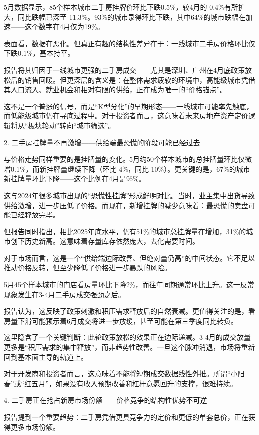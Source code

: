 \documentclass[11pt]{ctexart}
\begin{document}
5月数据显示，85个样本城市二手房挂牌价环比下跌0.5\%，较4月的-0.4\%有所扩大，同比跌幅已深至-11.3\%。93\%的城市录得环比下跌，其中64\%的城市跌幅在加速——这个数字在4月仅为19\%。

表面看，数据在恶化。但真正有趣的结构性差异在于：一线城市二手房价格环比仅下跌0.1\%，基本持平。

报告将其归因于一线城市更强的二手房成交——尤其是深圳、广州在4月底政策放松后的销售回暖。但更深层的含义是：在整体需求疲软的环境中，高能级城市凭借其人口流入、就业机会和相对有限的供给，正在成为唯一的“价格锚点”。

这不是一个普涨的信号，而是“K型分化”的早期形态——一线城市可能率先触底，而低能级城市仍在寻底过程中。对于投资者而言，这意味着未来房地产资产定价逻辑将从“板块轮动”转向“城市筛选”。

2. 二手房挂牌量不再激增——供给端最恐慌的阶段可能已经过去

与价格走势同样重要的是挂牌量的变化。5月约50个样本城市的总挂牌量环比仅微增0.1\%，而新挂牌量继续下降（环比-4\%，同比-10\%）。更关键的是，67\%的城市新挂牌量环比下降——这个比例在4月是96\%。

这与2024年很多城市出现的“恐慌性挂牌”形成鲜明对比。当时，业主集中出货导致供给激增，进一步压低了价格。而现在，新增挂牌的减少意味着：最恐慌的卖盘可能已经释放完毕。

但报告同时指出，相比2025年底水平，仍有51\%的城市总挂牌量在增加，31\%的城市创下历史新高。这意味着存量库存依然庞大，去化需要时间。

对于市场而言，这是一个“供给端边际改善、但绝对量仍高”的中间状态。它不足以推动价格反转，但至少降低了价格进一步暴跌的风险。

5月45个样本城市的门店看房量环比下降2\%，而往年同期通常环比上升。这一反常现象发生在3-4月二手房成交强劲之后。

报告认为，这反映了政策刺激和积压需求释放后的自然衰减。更值得关注的是，看房量下滑可能预示着6月成交将进一步放缓，甚至可能在第三季度同比转负。

这里隐含了一个关键判断：此轮政策放松的效果正在边际递减。3-4月的成交放量更多是“积压需求的集中释放”，而非趋势性改善。一旦这个脉冲消退，市场将重新回到基本面主导的轨道上。

对于开发商和投资者而言，这意味着不能将短期成交数据线性外推。所谓“小阳春”或“红五月”，如果没有收入预期改善和杠杆意愿回升的支撑，很难持续。

4. 二手房正在抢占新房市场份额——价格竞争的结构性优势不可逆

报告提到一个重要趋势：二手房凭借更具竞争力的定价和更低的单套总价，正在获得更多市场份额。
\end{document}
